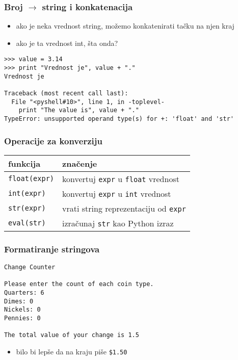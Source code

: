 \documentclass[utf8,compress]{beamer}
\begin{document}
\begin{frame}[fragile,shrink=6]
  \frametitle{Broj $\rightarrow$ string i konkatenacija}
  \begin{itemize}
    \item ako je neka vrednost string, možemo konkatenirati tačku na njen kraj
    \item ako je ta vrednost int, šta onda?
  \end{itemize}
\begin{verbatim}
>>> value = 3.14
>>> print "Vrednost je", value + "."
Vrednost je

Traceback (most recent call last):
  File "<pyshell#10>", line 1, in -toplevel-
    print "The value is", value + "."
TypeError: unsupported operand type(s) for +: 'float' and 'str'
\end{verbatim}
\end{frame}

\begin{frame}[fragile]
  \frametitle{Operacije za konverziju}
\begin{center}
\begin{tabular}{l|l}
\textbf{funkcija} & \textbf{značenje} \\ \hline
\texttt{float(expr)} & konvertuj \texttt{expr} u \texttt{float} vrednost \\
\texttt{int(expr)} & konvertuj \texttt{expr} u \texttt{int} vrednost \\
\texttt{str(expr)} & vrati string reprezentaciju od \texttt{expr} \\
\texttt{eval(str)} & izračunaj \texttt{str} kao Python izraz
\end{tabular}
\end{center}
\end{frame}

\begin{frame}[fragile]
  \frametitle{Formatiranje stringova}
\begin{verbatim}
Change Counter

Please enter the count of each coin type.
Quarters: 6
Dimes: 0
Nickels: 0
Pennies: 0

The total value of your change is 1.5
\end{verbatim}
  \begin{itemize}
    \item bilo bi lepše da na kraju piše \texttt{\$1.50}
  \end{itemize}
\end{frame}
\end{document}
